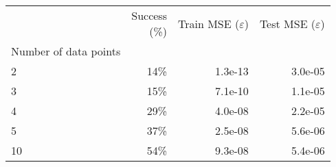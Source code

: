 \begin{tabular}{lrrr}
\toprule
{} & \shortstack{Success \\(\%)} & \shortstack{Train MSE \\ ($\varepsilon$)} & \shortstack{Test MSE \\ ($\varepsilon$)} \\
Number of data points &                             &                                           &                                          \\
\midrule
2                     &                        14\% &                                   1.3e-13 &                                  3.0e-05 \\
3                     &                        15\% &                                   7.1e-10 &                                  1.1e-05 \\
4                     &                        29\% &                                   4.0e-08 &                                  2.2e-05 \\
5                     &                        37\% &                                   2.5e-08 &                                  5.6e-06 \\
10                    &                        54\% &                                   9.3e-08 &                                  5.4e-06 \\
\bottomrule
\end{tabular}